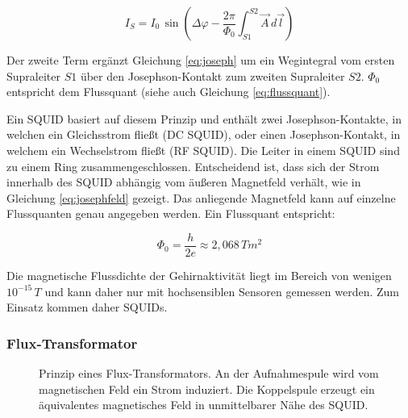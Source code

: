 \documentclass[doc,a4paper,12pt]{apa6}
\begin{document}
\begin{equation}
\label{eq:josephfeld}
I_S = I_0\,\sin{\left( \Delta \varphi - \frac{2\pi}{\Phi_0} \int_{S1}^{S2} \vec{A}\,d\vec{l} \right)}
\end{equation}

Der zweite Term ergänzt Gleichung \ref{eq:joseph} um ein Wegintegral vom ersten Supraleiter $S1$ über den Josephson-Kontakt zum zweiten Supraleiter $S2$. $\Phi_0$ entspricht dem Flussquant (siehe auch Gleichung \ref{eq:flussquant}).

Ein SQUID basiert auf diesem Prinzip und enthält zwei Josephson-Kontakte, in welchen ein Gleichsstrom fließt (DC SQUID), oder einen Josephson-Kontakt, in welchem ein Wechselstrom fließt (RF SQUID). Die Leiter in einem SQUID sind zu einem Ring zusammengeschlossen. Entscheidend ist, dass sich der Strom innerhalb des SQUID abhängig vom äußeren Magnetfeld verhält, wie in Gleichung \ref{eq:josephfeld} gezeigt. Das anliegende Magnetfeld kann auf einzelne Flussquanten genau angegeben werden. Ein Flussquant entspricht:

\begin{equation}
\label{eq:flussquant}
\Phi_0 = \frac{h}{2e} \approx 2,068\,Tm^2
\end{equation}

Die magnetische Flussdichte der Gehirnaktivität liegt im Bereich von wenigen $10^{-15}\,T$ und kann daher nur mit hochsensiblen Sensoren gemessen werden. Zum Einsatz kommen daher SQUIDs.

\subsubsection{Flux-Transformator}

\begin{figure}[t]
  \centering
  \setlength{\fboxsep}{8mm}
  \vspace*{3mm}
  \caption[Prinzip eines Flux-Transformators]{Prinzip eines Flux-Transformators. An der Aufnahmespule wird vom magnetischen Feld ein Strom induziert. Die Koppelspule erzeugt ein äquivalentes magnetisches Feld in unmittelbarer Nähe des SQUID.}
  \label{img:flux-trafo}
\end{figure}
\end{document}
